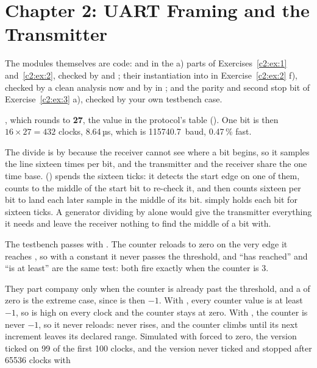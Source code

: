 
\section{Chapter 2: UART Framing and the Transmitter}
\label{sol:c2}
The modules themselves are code:  and  in the a) parts of
Exercises~\ref{c2:ex:1} and~\ref{c2:ex:2}, checked by  and ;
their instantiation into  in Exercise~\ref{c2:ex:2} f), checked by a clean analysis
now and by  in ; and the parity and second stop bit of
Exercise~\ref{c2:ex:3} a), checked by your own testbench case.

 , which rounds to \textbf{27}, the value in the
protocol's table (). One bit is then $16 \times 27 = 432$ clocks, 8.64\,µs,
which is 115740.7~baud, 0.47\,\% fast.

The divide is by  because the receiver cannot see where a bit begins, so it samples
the line sixteen times per bit, and the transmitter and the receiver share the one time base.
 () spends the sixteen ticks: it detects the start edge on one of them,
counts to the middle of the start bit to re-check it, and then counts sixteen per bit to land each
later sample in the middle of its bit.  simply holds each bit for sixteen ticks. A
generator dividing by  alone would give the transmitter everything it needs and leave the
receiver nothing to find the middle of a bit with.

 The testbench passes with . The counter reloads to zero on the very
edge it reaches , so with a constant  it never passes the threshold, and
``has reached'' and ``is at least'' are the same test: both fire exactly when the counter is 3.

They part company only when the counter is already past the threshold, and a  of zero is
the extreme case, since  is then $-1$. With \code{>=}, every counter value is at least
$-1$, so  is high on every clock and the counter stays at zero. With \code{=}, the
counter is never $-1$, so it never reloads:  never rises, and the counter climbs until
its next increment leaves its declared range. Simulated with  forced to zero, the
\code{>=} version ticked on 99 of the first 100 clocks, and the \code{=} version never ticked and
stopped after 65536 clocks with


